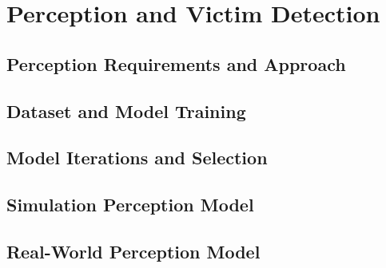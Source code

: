 \section{Perception and Victim Detection}
\label{sec:perception}
\label{chap:perception}   %


\subsection{Perception Requirements and Approach}
\label{sec:perception_requirements}

\subsection{Dataset and Model Training}
\label{sec:perception_dataset}

\subsection{Model Iterations and Selection}
\label{sec:perception_models}

\subsection{Simulation Perception Model}
\label{sec:perception_sim}

\subsection{Real-World Perception Model}
\label{sec:perception_real}


